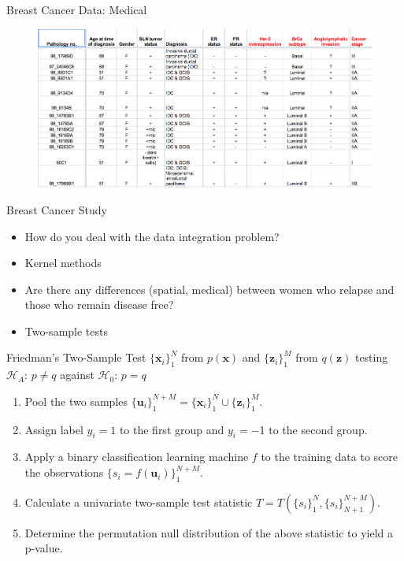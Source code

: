 \documentclass{beamer}
\begin{document}
\begin{frame}{Breast Cancer Data: Medical}
  \begin{figure}
    \centering
    \includegraphics[scale=.5]{medical.png}
  \end{figure}
\end{frame}

\begin{frame}{Breast Cancer Study}
  \begin{itemize}
  \item How do you deal with the data integration problem? \pause
  \item Kernel methods \pause
  \item Are there any differences (spatial, medical) between women who
    relapse and those who remain disease free? \pause 
  \item Two-sample tests
  \end{itemize}
\end{frame}

\begin{frame}{Friedman's Two-Sample Test}
  $\{\mathbf{x}_i\}_1^N$ from $p(\mathbf{x})$ and
  $\{\mathbf{z}_i\}_1^M$ from $q(\mathbf{z})$ testing \\ 
  $\mathcal{H}_A$: $p \neq q$ against $\mathcal{H}_0$: $p = q$ \pause
  \begin{enumerate}
  \item Pool the two samples $\{\mathbf{u}_i\}_1^{N+M} =
    \{\mathbf{x}_i\}_1^{N} \cup \{\mathbf{z}_i\}_1^{M}$. \pause
  \item Assign label $y_i = 1$ to the first group and $y_i = -$1 to
    the second group. \pause
  \item Apply a binary classification learning machine $f$ to the training
    data to score the observations $\{s_i =
    f(\mathbf{u}_i)\}_1^{N+M}$. \pause
  \item Calculate a univariate two-sample test statistic $T =
    T(\{s_i\}_1^N,\{s_i\}_{N+1}^{N+M})$. \pause
  \item Determine the permutation null distribution of the above
    statistic to yield a p-value.
  \end{enumerate}  
\end{frame}
\end{document}
